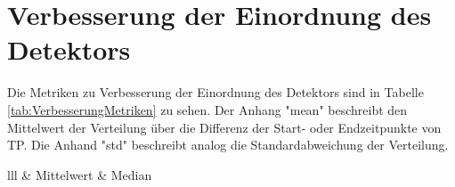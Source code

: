 \section{Verbesserung der Einordnung des Detektors}
Die Metriken zu Verbesserung der Einordnung des Detektors sind in Tabelle \ref{tab:VerbesserungMetriken} zu sehen. Der Anhang "mean" beschreibt den Mittelwert der Verteilung über die Differenz der Start- oder Endzeitpunkte von TP. Die Anhand "std" beschreibt analog die Standardabweichung der Verteilung.
\begin{table}[!ht]
\caption{Metriken aus dem Kapitel \ref{Verbesserung}: "Verbesserung der Einordnung des Detektors"}
	\centering
		\begin{tabular}{lll}
			\hline & Mittelwert & Median\\
\end{tabular}
\end{table}
